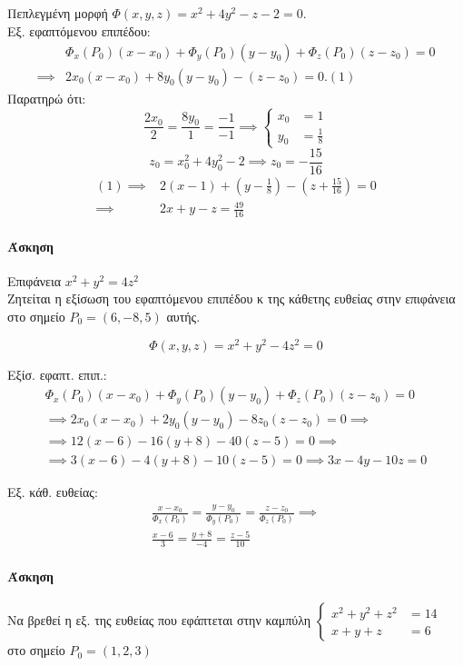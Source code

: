 \documentclass[11pt,a4paper,titlepage]{article}
\begin{document}
\subparagraph{}
Πεπλεγμένη μορφή \( \Phi(x,y,z)=x^2+4y^2-z-2=0 \).\\
Εξ. εφαπτόμενου επιπέδου:
\begin{align*}
 & \Phi_x(P_0)(x-x_0)+\Phi_y(P_0)(y-y_0)+\Phi_z(P_0)(z-z_0) =0  \\
\implies & 2x_0(x-x_0) + 8y_0(y-y_0)-(z-z_0) = 0. (1)
\end{align*}
Παρατηρώ ότι: \[
\frac{2x_0}{2} = \frac{8y_0}{1} = \frac{-1}{-1} \implies \begin{cases}
x_0 &=1 \\ y_0 &= \frac{1}{8}
\end{cases}
\]
\[
z_0=x_0^2+4y_0^2-2 \implies z_0 = -\frac{15}{16}
\]
\begin{align*}
(1) \implies & 2(x-1)+\left( y-\frac{1}{8} \right) - \left(z+\frac{15}{16} \right) =0 \\
\implies & 2x+y-z=\frac{49}{16}
\end{align*}

\paragraph{Άσκηση}
Επιφάνεια \( x^2+y^2=4z^2 \)\\
Ζητείται η εξίσωση του εφαπτόμενου επιπέδου κ της κάθετης ευθείας στην επιφάνεια στο σημείο \( P_0=(6,-8,5) \) αυτής.

\[
\Phi(x,y,z)=x^2+y^2-4z^2=0
\]

Εξίσ. εφαπτ. επιπ.: \begin{align*}
\Phi_x(P_0)(x-x_0)+
\Phi_y(P_0)(y-y_0)+
\Phi_z(P_0)(z-z_0) = 0
\\
\implies 2x_0(x-x_0)+2y_0(y-y_0)-8z_0(z-z_0) = 0 \implies \\
\implies 12(x-6)-16(y+8)-40(z-5)=0 \implies \\
\implies 3(x-6) -4(y+8) -10(z-5)=0 \implies \boxed{3x-4y-10z=0}
\end{align*}

Εξ. κάθ. ευθείας: \begin{align*}
\frac{x-x_0}{\Phi_x(P_0)}
=\frac{y-y_0}{\Phi_y(P_0)}
=\frac{z-z_0}{\Phi_z(P_0)} \implies \\
\frac{x-6}{3} = \frac{y+8}{-4} = \frac{z-5}{10}
\end{align*}

\paragraph{Άσκηση}
Να βρεθεί η εξ. της ευθείας που εφάπτεται στην καμπύλη
\(
\begin{cases}
x^2+y^2+z^2 &=14 \\x+y+z &=6
\end{cases}
\) στο σημείο \( P_0=(1,2,3) \)
\end{document}
